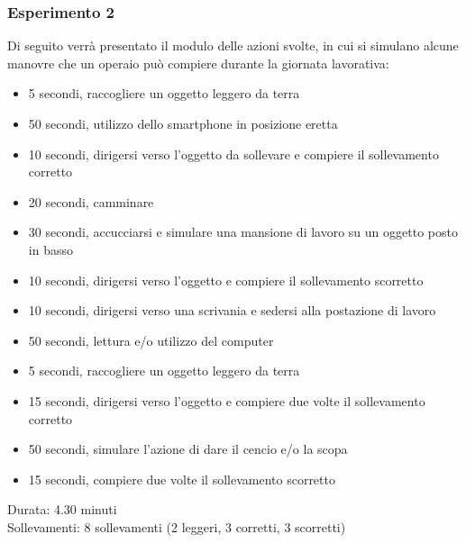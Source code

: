 \documentclass[a4paper]{article}
\begin{document}
	\subsubsection{Esperimento 2}
Di seguito verrà presentato il modulo delle azioni svolte, in cui si simulano alcune manovre che un operaio può compiere durante la giornata lavorativa:
\begin{itemize}
\item 5 secondi, raccogliere un oggetto leggero da terra
\item 50 secondi,  utilizzo dello smartphone in posizione eretta 
\item 10 secondi, dirigersi verso l’oggetto da sollevare e compiere il sollevamento corretto
\item 20 secondi, camminare
\item 30 secondi, accucciarsi e simulare una mansione di lavoro su un oggetto posto in basso
\item 10 secondi, dirigersi verso l’oggetto e compiere il sollevamento scorretto
\item 10 secondi, dirigersi verso una scrivania e sedersi alla postazione di lavoro
\item 50 secondi, lettura e/o utilizzo del computer
\item 5 secondi, raccogliere un oggetto leggero da terra
\item 15 secondi, dirigersi verso l’oggetto e compiere due volte il sollevamento corretto
\item 50 secondi, simulare l’azione di dare il cencio e/o la scopa
\item 15 secondi, compiere due volte il sollevamento scorretto
\end{itemize}
Durata: 4.30 minuti \\
Sollevamenti: 8 sollevamenti (2 leggeri, 3 corretti, 3 scorretti)\\
\end{document}
